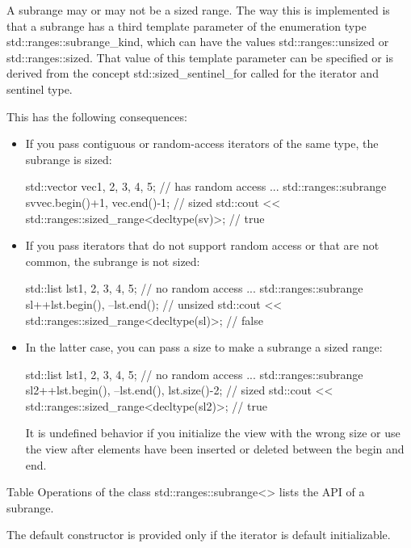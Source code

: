 A subrange may or may not be a sized range. The way this is implemented is that a subrange has a third template parameter of the enumeration type std::ranges::subrange\_kind, which can have the values std::ranges::unsized or std::ranges::sized. That value of this template parameter can be specified or is derived from the concept std::sized\_sentinel\_for called for the iterator and sentinel type.

This has the following consequences:

\begin{itemize}
\item
If you pass contiguous or random-access iterators of the same type, the subrange is sized:

\begin{cpp}
std::vector vec{1, 2, 3, 4, 5}; // has random access
...
std::ranges::subrange sv{vec.begin()+1, vec.end()-1}; // sized
std::cout << std::ranges::sized_range<decltype(sv)>; // true
\end{cpp}

\item
If you pass iterators that do not support random access or that are not common, the subrange is not sized:

\begin{cpp}
std::list lst{1, 2, 3, 4, 5}; // no random access
...
std::ranges::subrange sl{++lst.begin(), --lst.end()}; // unsized
std::cout << std::ranges::sized_range<decltype(sl)>; // false
\end{cpp}

\item
In the latter case, you can pass a size to make a subrange a sized range:

\begin{cpp}
std::list lst{1, 2, 3, 4, 5}; // no random access
...
std::ranges::subrange sl2{++lst.begin(), --lst.end(), lst.size()-2}; // sized
std::cout << std::ranges::sized_range<decltype(sl2)>; // true
\end{cpp}

It is undefined behavior if you initialize the view with the wrong size or use the view after elements have been inserted or deleted between the begin and end.
\end{itemize}


Table Operations of the class std::ranges::subrange<> lists the API of a subrange.

The default constructor is provided only if the iterator is default initializable.

